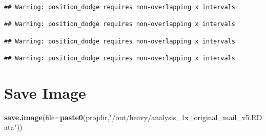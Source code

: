 \documentclass[
]{article}
\newenvironment{Shaded}{\begin{snugshade}}{\end{snugshade}}
\newcommand{\DataTypeTok}[1]{\textcolor[rgb]{0.13,0.29,0.53}{#1}}
\newcommand{\KeywordTok}[1]{\textcolor[rgb]{0.13,0.29,0.53}{\textbf{#1}}}
\newcommand{\NormalTok}[1]{#1}
\newcommand{\StringTok}[1]{\textcolor[rgb]{0.31,0.60,0.02}{#1}}
\begin{document}
\begin{verbatim}
## Warning: position_dodge requires non-overlapping x intervals

## Warning: position_dodge requires non-overlapping x intervals

## Warning: position_dodge requires non-overlapping x intervals

## Warning: position_dodge requires non-overlapping x intervals
\end{verbatim}

\hypertarget{save-image}{%
\section{Save Image}\label{save-image}}

\begin{Shaded}
\begin{Highlighting}[]
\KeywordTok{save.image}\NormalTok{(}\DataTypeTok{file=}\KeywordTok{paste0}\NormalTok{(projdir,}\StringTok{"/out/heavy/analysis_1x_original_mail_v5.RData"}\NormalTok{))}
\end{Highlighting}
\end{Shaded}
\end{document}
